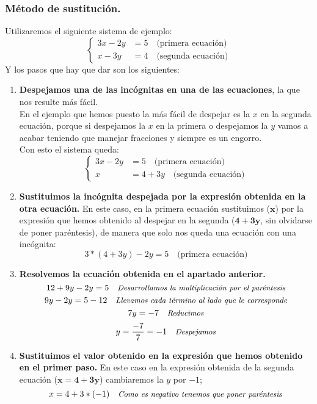 \documentclass[a4paper,11pt,answers]{exam}
\begin{document}
  \subsubsection{Método de sustitución.}
  Utilizaremos el siguiente sistema de ejemplo:
  \[\begin{cases}
      3x-2y&=5 \quad \text{(primera ecuación)}\\
      x-3y &= 4 \quad \text{(segunda ecuación)}
    \end{cases}\]
  Y los pasos que hay que dar son los siguientes:
  \begin{enumerate}
  \item \textbf{Despejamos una de las incógnitas en una de las ecuaciones}, la que nos resulte más fácil.\\
    En el ejemplo que hemos puesto la más fácil de despejar es la $x$ en la segunda ecuación, porque si despejamos la $x$ en la primera o despejamos la $y$ vamos a acabar teniendo que manejar fracciones y siempre es un engorro.\\
    Con esto el sistema queda:
    \[\begin{cases}
        3x-2y&=5 \quad \text{(primera ecuación)}\\
        x&= 4 + 3y \quad \text{(segunda ecuación)}
      \end{cases}  
    \]
  \item \textbf{Sustituimos la incógnita despejada por la expresión obtenida en la otra ecuación.} En este caso, en la primera ecuación sustituimos ($\boldsymbol{x}$) por la expresión que hemos obtenido al despejar en la segunda ($\boldsymbol{4+3y}$, sin olvidarse de poner paréntesis), de manera que solo nos queda una ecuación con una incógnita:
    \[3*(4+3y) - 2y = 5 \quad \text{(primera ecuación)}\]
  \item \textbf{Resolvemos la ecuación obtenida en el apartado anterior.}
    \[12 + 9y - 2y = 5\quad \text{\small {\textit{Desarrollamos la multiplicación por el paréntesis}}}\]
    \[9y - 2y = 5 - 12\quad \text{\small {\textit{Llevamos cada término al lado que le corresponde}}}\]
    \[7y = -7\quad\text{\small{\textit{Reducimos}}}\]
    \[y = \frac{-7}{7} = -1\quad\text{\small{\textit{Despejamos}}}\]
  \item \textbf{Sustituimos el valor obtenido en la expresión que hemos obtenido en el primer paso.} En este caso en la expresión obtenida de la segunda ecuación ($\boldsymbol{x = 4 + 3y}$) cambiaremos la $y$ por $-1$;
    \[x = 4 + 3*(-1) \quad\text{\small{\textit{Como es negativo tenemos que poner paréntesis}}}\]

\end{enumerate}
\end{document}
